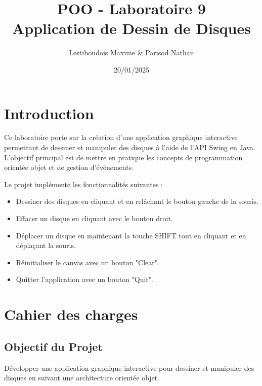 \documentclass[12pt]{report}
\title{POO - Laboratoire 9 \\ \large Application de Dessin de Disques}
\author{Lestiboudois Maxime \& Parisod Nathan}
\date{20/01/2025}
\begin{document}
    \maketitle
    \tableofcontents
    \newpage


    \section*{Introduction}
    Ce laboratoire porte sur la création d'une application graphique interactive permettant de dessiner et manipuler des disques à l'aide de l'API Swing en Java.
    L'objectif principal est de mettre en pratique les concepts de programmation orientée objet et de gestion d'événements.

    Le projet implémente les fonctionnalités suivantes :
    \begin{itemize}
        \item Dessiner des disques en cliquant et en relâchant le bouton gauche de la souris.
        \item Effacer un disque en cliquant avec le bouton droit.
        \item Déplacer un disque en maintenant la touche SHIFT tout en cliquant et en déplaçant la souris.
        \item Réinitialiser le canvas avec un bouton "Clear".
        \item Quitter l'application avec un bouton "Quit".
    \end{itemize}

    \section*{Cahier des charges}
    \subsection*{Objectif du Projet}
    Développer une application graphique interactive pour dessiner et manipuler des disques en suivant une architecture orientée objet.
\end{document}
